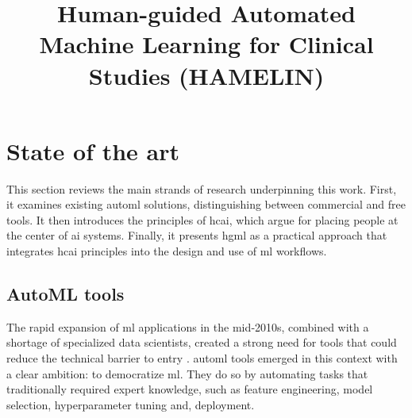 \documentclass[twoside,final]{Contexto}
\title{Human-guided Automated Machine Learning for Clinical Studies (HAMELIN)}
\begin{document}
\coverpage%


\tableofcontents
\listoffigures
\listoftables
\lstlistoflistings{}

\clearpage

\section{State of the art}
\label{sec:state-of-the-art}

This section reviews the main strands of research underpinning this work. First, it examines existing \gls{automl} solutions, distinguishing between commercial and free tools. It then introduces the principles of \gls{hcai}, which argue for placing people at the center of \gls{ai} systems. Finally, it presents \gls{hgml} as a practical approach that integrates \gls{hcai} principles into the design and use of \gls{ml} workflows.

\subsection{AutoML tools}
\label{subsec:automltools}

The rapid expansion of \gls{ml} applications in the mid‑2010s, combined with a shortage of specialized data scientists, created a strong need for tools that could reduce the technical barrier to entry \cite{he2021automl}. \gls{automl} tools emerged in this context with a clear ambition: to democratize \gls{ml}. They do so by automating tasks that traditionally required expert knowledge, such as feature engineering, model selection, hyperparameter tuning and, deployment.
\end{document}
